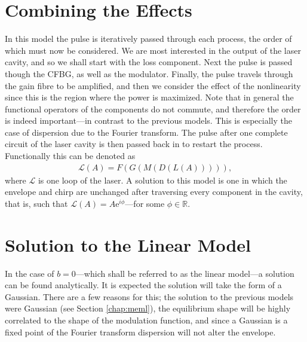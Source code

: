 \section{Combining the Effects}
\label{sec:effects}
In this model the pulse is iteratively passed through each process, the order of which must now be considered. We are most interested in the output of the laser cavity, and so we shall start with the loss component. Next the pulse is passed though the CFBG, as well as the modulator. Finally, the pulse travels through the gain fibre to be amplified, and then we consider the effect of the nonlinearity since this is the region where the power is maximized. Note that in general the functional operators of the components do not commute, and therefore the order is indeed important---in contrast to the previous models. This is especially the case of dispersion due to the Fourier transform. The pulse after one complete circuit of the laser cavity is then passed back in to restart the process. Functionally this can be denoted as
\begin{align*}
	\mathcal{L}(A) = F(G(M(D(L(A))))),
\end{align*}
where $\mathcal{L}$ is one loop of the laser. A solution to this model is one in which the envelope and chirp are unchanged after traversing every component in the cavity, that is, such that $\mathcal{L}(A) = A \textrm{e}^{i \phi}$---for some $\phi \in \mathbb{R}$.

\section{Solution to the Linear Model}
\label{sec:linear}
In the case of $b = 0$---which shall be referred to as the linear model---a solution can be found analytically. It is expected the solution will take the form of a Gaussian. There are a few reasons for this; the solution to the previous models were Gaussian \cite{cutler, seigman, kuizenga1970a, martinez1984, martinez1985} (see Section \ref{chap:meml}), the equilibrium shape will be highly correlated to the shape of the modulation function, and since a Gaussian is a fixed point of the Fourier transform \cite{gradshteyn} dispersion will not alter the envelope. \\

